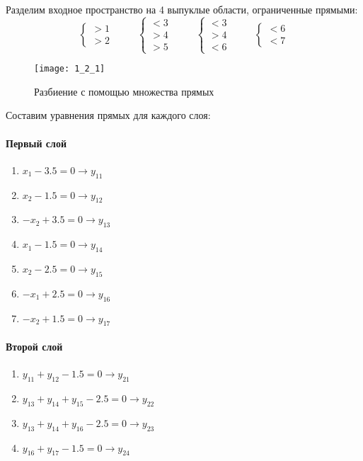 Разделим входное пространство на 4 выпуклые области, ограниченные прямыми:
\begin{equation*}
	\begin{cases}
		>1\\
		>2
	\end{cases}
	\hspace{1cm}
	\begin{cases}
		<3\\
		>4\\
		>5
	\end{cases}
	\hspace{1cm}
	\begin{cases}
		<3\\
		>4\\
		<6
	\end{cases}
	\hspace{1cm}
	\begin{cases}
		<6\\
		<7
	\end{cases}
\end{equation*}

\begin{figure}[H]
\begin{center}
	\texttt{[image: 1\_2\_1]}
	\caption{Разбиение с помощью множества прямых}
	\label{fig:1_2_1}
\end{center}
\end{figure}

Составим уравнения прямых для каждого слоя:

\paragraph{Первый слой}
\begin{enumerate}
	\item $x_1 - 3.5 = 0 \rightarrow y_{11}$
	\item $x_2 - 1.5 = 0 \rightarrow y_{12}$
	\item $-x_2 + 3.5 = 0 \rightarrow y_{13}$
	\item $x_1 - 1.5 = 0 \rightarrow y_{14}$
	\item $x_2 - 2.5 = 0 \rightarrow y_{15}$
	\item $-x_1 + 2.5 = 0 \rightarrow y_{16}$
	\item $-x_2 + 1.5 = 0 \rightarrow y_{17}$
\end{enumerate}

\paragraph{Второй слой}
\begin{enumerate}
	\item $y_{11} + y_{12} - 1.5 = 0 \rightarrow y_{21}$
	\item $y_{13} + y_{14} + y_{15} - 2.5 = 0 \rightarrow y_{22}$
	\item $y_{13} + y_{14} + y_{16} - 2.5 = 0 \rightarrow y_{23}$
	\item $y_{16} + y_{17} - 1.5 = 0 \rightarrow y_{24}$
\end{enumerate}

